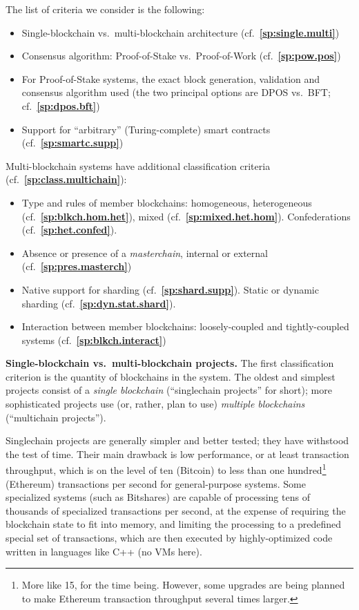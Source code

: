 \documentclass[12pt,oneside]{article}
\def\makepoint#1{\medbreak\noindent{\bf #1.\ }}
\def\nxsubpoint{\refstepcounter{subsubsection}%
  \smallbreak\makepoint{\thesubsubsection}}
\def\refpoint#1{{\rm\textbf{\ref{#1}}}}
\let\ptref=\refpoint
\def\embt(#1.){\textbf{#1.}}
\begin{document}
The list of criteria we consider is the following:
\begin{itemize}
\item Single-blockchain vs.\ multi-blockchain architecture
  (cf.~\ptref{sp:single.multi})
\item Consensus algorithm: Proof-of-Stake vs.\ Proof-of-Work
  (cf.~\ptref{sp:pow.pos})
\item For Proof-of-Stake systems, the exact block generation,
  validation and consensus algorithm used (the two principal options
  are DPOS vs.\ BFT; cf.~\ptref{sp:dpos.bft})
\item Support for ``arbitrary'' (Turing-complete) smart contracts
  (cf.~\ptref{sp:smartc.supp})
\end{itemize}
Multi-blockchain systems have additional classification criteria
(cf.~\ptref{sp:class.multichain}):
\begin{itemize}
\item Type and rules of member blockchains: homogeneous, heterogeneous
  (cf.~\ptref{sp:blkch.hom.het}), mixed
  (cf.~\ptref{sp:mixed.het.hom}). Confederations
  (cf.~\ptref{sp:het.confed}).
\item Absence or presence of a {\em masterchain}, internal or external
  (cf.~\ptref{sp:pres.masterch})
\item Native support for sharding (cf.~\ptref{sp:shard.supp}). Static
  or dynamic sharding (cf.~\ptref{sp:dyn.stat.shard}).
\item Interaction between member blockchains: loosely-coupled and
  tightly-coupled systems (cf.~\ptref{sp:blkch.interact})
\end{itemize}

\nxsubpoint\label{sp:single.multi} \embt(Single-blockchain
vs.\ multi-blockchain projects.)  The first classification criterion
is the quantity of blockchains in the system. The oldest and simplest
projects consist of a {\em single blockchain\/} (``singlechain
projects'' for short); more sophisticated projects use (or, rather,
plan to use) {\em multiple blockchains\/} (``multichain projects'').

Singlechain projects are generally simpler and better tested; they
have withstood the test of time. Their main drawback is low
performance, or at least transaction throughput, which is on the level
of ten (Bitcoin) to less than one hundred\footnote{More like 15, for
  the time being. However, some upgrades are being planned to make
  Ethereum transaction throughput several times larger.}  (Ethereum)
transactions per second for general-purpose systems. Some specialized
systems (such as Bitshares) are capable of processing tens of
thousands of specialized transactions per second, at the expense of
requiring the blockchain state to fit into memory, and limiting the
processing to a predefined special set of transactions, which are then
executed by highly-optimized code written in languages like C++ (no
VMs here).
\end{document}
